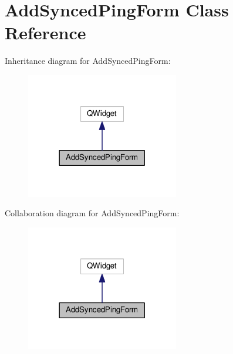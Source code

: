\hypertarget{class_add_synced_ping_form}{}\section{Add\+Synced\+Ping\+Form Class Reference}
\label{class_add_synced_ping_form}


Inheritance diagram for Add\+Synced\+Ping\+Form\+:
\nopagebreak
\begin{figure}[H]
\begin{center}
\leavevmode
\includegraphics[width=189pt]{class_add_synced_ping_form__inherit__graph}
\end{center}
\end{figure}


Collaboration diagram for Add\+Synced\+Ping\+Form\+:
\nopagebreak
\begin{figure}[H]
\begin{center}
\leavevmode
\includegraphics[width=189pt]{class_add_synced_ping_form__coll__graph}
\end{center}
\end{figure}
